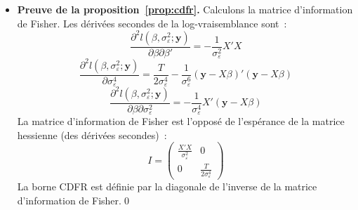 \documentclass[10pt,a4paper]{article}
\theoremstyle{definition}
\begin{document}
\begin{notes}

  \begin{itemize}

  \item \textbf{Preuve de la proposition~\ref{prop:cdfr}.} Calculons la matrice d'information de Fisher. Les dérivées secondes de la log-vraisemblance sont~:
    \[
      \frac{\partial^2 l(\beta, \sigma_{\varepsilon}^2; \mathbf y)}{\partial\beta\partial\beta'} = -\frac{1}{\sigma_{\varepsilon}^2}X'X
    \]
    \[
      \frac{\partial^2 l(\beta, \sigma_{\varepsilon}^2; \mathbf y)}{\partial\sigma_{\varepsilon}^4} = \frac{T}{2\sigma_{\varepsilon}^4}-\frac{1}{\sigma_{\varepsilon}^6}\left( \mathbf y-X\beta \right)'\left( \mathbf y-X\beta \right)
    \]
    \[
      \frac{\partial^2 l(\beta, \sigma_{\varepsilon}^2; \mathbf y)}{\partial\beta\partial\sigma_{\varepsilon}^2} = -\frac{1}{\sigma_{\varepsilon}^4}X'\left( \mathbf y - X\beta \right)
    \]
    La matrice d'information de Fisher est l'opposé de l'espérance de la matrice hessienne (des dérivées secondes)~:
    \[
      I =
      \begin{pmatrix}
        \frac{X'X}{\sigma_{\varepsilon}^2} & 0 \\
        0                                  & \frac{T}{2\sigma_{\varepsilon}^4}
      \end{pmatrix}
    \]
    La borne CDFR est définie par la diagonale de l'inverse de la matrice d'information de Fisher.\qed

  \end{itemize}

\end{notes}
\end{document}

